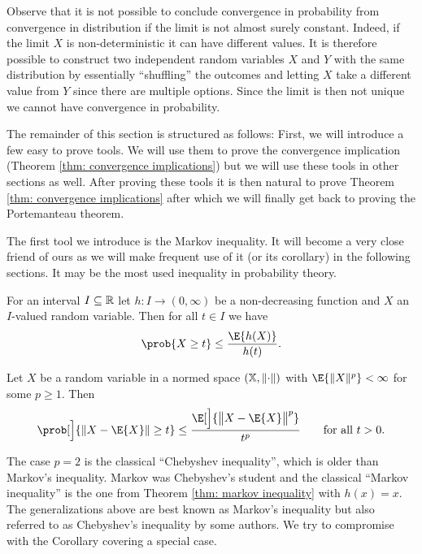 Observe that it is not possible to conclude convergence in probability 
from convergence in distribution if the limit is not almost surely constant.
Indeed, if the limit \(X\) is non-deterministic it can have different values.
It is therefore possible to construct two independent random variables \(X\) and \(Y\)
with the same distribution by essentially ``shuffling'' the outcomes and
letting \(X\) take a different value from \(Y\) since there are multiple
options. Since the limit is then not unique we cannot have convergence in
probability.

The remainder of this section is structured as follows: First, we will introduce
a few easy to prove tools. We will use them to prove the convergence implication
(Theorem \ref{thm: convergence implications}) but we will use these tools in other
sections as well. After proving these tools it is then natural to prove
Theorem \ref{thm: convergence implications} after which we will finally get
back to proving the Portemanteau theorem.

The first tool we introduce is the Markov inequality. It will become a very
close friend of ours as we will make frequent use of it (or its corollary)
in the following sections. It may be the most used inequality in probability
theory.

\begin{mdframed}[innertopmargin=0pt]
\begin{theorem}
    \label{thm: markov inequality}
    For an interval \(I\subseteq \mathbb{R}\) let \(h\colon I\to (0, \infty)\) be a
    non-decreasing function and \(X\) an \(I\)-valued random variable.
    Then for all \(t \in I\) we have
    \[
        \prob{X \ge t} \le \frac{\E{h(X)}}{h(t)}.
    \]
\end{theorem}
\begin{corollary}
    \label{cor: markov inequality Lp}
    Let \(X\) be a random variable in a normed space \((\mathbb{X}, \lVert\cdot\rVert)\)
    with \(\E{\norm{X}^p} < \infty\) for some \(p \ge 1\). Then
    \[
        \prob[\Big]{\norm{X - \E{X}} \ge t}
        \le \frac{\E[\Big]{\norm[\big]{X-\E{X}}^p}}{t^p}
        \qquad \text{for all }t > 0.
    \]
\end{corollary}
\end{mdframed}
\begin{remark}
    The case \(p=2\) is the classical ``Chebyshev inequality'', which
    is older than Markov's inequality.  Markov was Chebyshev's student and the
    classical ``Markov inequality'' is the one from Theorem \ref{thm: markov
    inequality} with \(h(x) = x\). The generalizations above are best known
    as Markov's inequality but also referred to as Chebyshev's inequality by
    some authors. We try to compromise with the Corollary covering a
    special case.
\end{remark}

